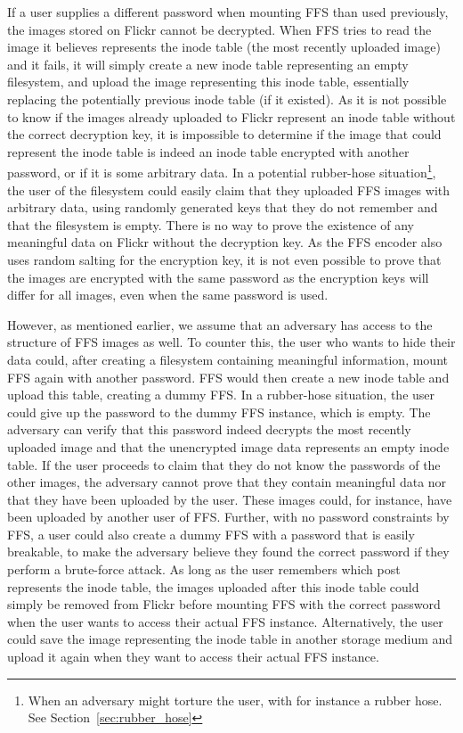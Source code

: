 If a user supplies a different password when mounting \gls{FFS} than used previously, the images stored on Flickr cannot be decrypted. When \gls{FFS} tries to read the image it believes represents the inode table (the most recently uploaded image) and it fails, it will simply create a new inode table representing an empty filesystem, and upload the image representing this inode table, essentially replacing the potentially previous inode table (if it existed). As it is not possible to know if the images already uploaded to Flickr represent an inode table without the correct decryption key, it is impossible to determine if the image that could represent the inode table is indeed an inode table encrypted with another password, or if it is some arbitrary data. In a potential \mbox{rubber-hose} situation\footnote{When an adversary might torture the user, with for instance a rubber hose. See Section~\ref{sec:rubber_hose}}, the user of the filesystem could easily claim that they uploaded \gls{FFS} images with arbitrary data, using randomly generated keys that they do not remember and that the filesystem is empty. There is no way to prove the existence of any meaningful data on Flickr without the decryption key. As the \gls{FFS} encoder also uses random salting for the encryption key, it is not even possible to prove that the images are encrypted with the same password as the encryption keys will differ for all images, even when the same password is used. 

However, as mentioned earlier, we assume that an adversary has access to the structure of \gls{FFS} images as well. To counter this, the user who wants to hide their data could, after creating a filesystem containing meaningful information, mount \gls{FFS} again with another password. \gls{FFS} would then create a new inode table and upload this table, creating a dummy \gls{FFS}. In a \mbox{rubber-hose} situation, the user could give up the password to the dummy \gls{FFS} instance, which is empty. The adversary can verify that this password indeed decrypts the most recently uploaded image and that the unencrypted image data represents an empty inode table. If the user proceeds to claim that they do not know the passwords of the other images, the adversary cannot prove that they contain meaningful data nor that they have been uploaded by the user. These images could, for instance, have been uploaded by another user of \gls{FFS}. Further, with no password constraints by \gls{FFS}, a user could also create a dummy \gls{FFS} with a password that is easily breakable, to make the adversary believe they found the correct password if they perform a \mbox{brute-force} attack. As long as the user remembers which post represents the inode table, the images uploaded after this inode table could simply be removed from Flickr before mounting \gls{FFS} with the correct password when the user wants to access their actual \gls{FFS} instance. Alternatively, the user could save the image representing the inode table in another storage medium and upload it again when they want to access their actual \gls{FFS} instance.


